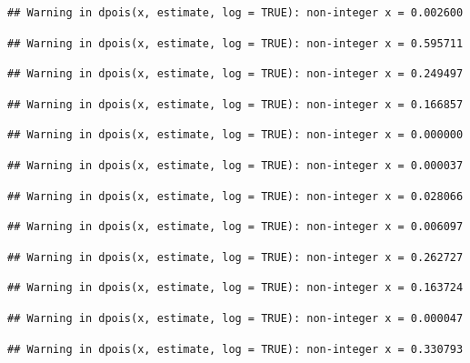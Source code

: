 \documentclass[]{article}
\begin{document}
\begin{verbatim}
## Warning in dpois(x, estimate, log = TRUE): non-integer x = 0.002600
\end{verbatim}

\begin{verbatim}
## Warning in dpois(x, estimate, log = TRUE): non-integer x = 0.595711
\end{verbatim}

\begin{verbatim}
## Warning in dpois(x, estimate, log = TRUE): non-integer x = 0.249497
\end{verbatim}

\begin{verbatim}
## Warning in dpois(x, estimate, log = TRUE): non-integer x = 0.166857
\end{verbatim}

\begin{verbatim}
## Warning in dpois(x, estimate, log = TRUE): non-integer x = 0.000000
\end{verbatim}

\begin{verbatim}
## Warning in dpois(x, estimate, log = TRUE): non-integer x = 0.000037
\end{verbatim}

\begin{verbatim}
## Warning in dpois(x, estimate, log = TRUE): non-integer x = 0.028066
\end{verbatim}

\begin{verbatim}
## Warning in dpois(x, estimate, log = TRUE): non-integer x = 0.006097
\end{verbatim}

\begin{verbatim}
## Warning in dpois(x, estimate, log = TRUE): non-integer x = 0.262727
\end{verbatim}

\begin{verbatim}
## Warning in dpois(x, estimate, log = TRUE): non-integer x = 0.163724
\end{verbatim}

\begin{verbatim}
## Warning in dpois(x, estimate, log = TRUE): non-integer x = 0.000047
\end{verbatim}

\begin{verbatim}
## Warning in dpois(x, estimate, log = TRUE): non-integer x = 0.330793
\end{verbatim}
\end{document}
